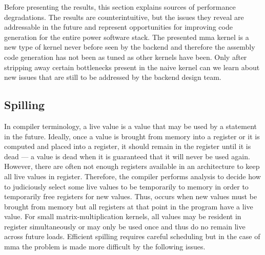 \documentclass[\main/thesis.tex]{subfiles}
\begin{document}
Before presenting the results, this section explains sources of performance degradations.
The results are counterintuitive, but the issues they reveal are addressable in the future and represent opportunities for improving code generation for the entire \gls{power} software stack.
The presented \gls{mma} kernel is a new type of kernel never before seen by the backend and therefore the assembly code generation has not been as tuned as other kernels have been.
Only after stripping away certain bottlenecks present in the naive kernel can we learn about new issues that are still to be addressed by the backend design team.

\subsection{Spilling}
In compiler terminology, a \gls{live} value is a value that may be used by a statement in the future.
Ideally, once a value is brought from memory into a register or it is computed and placed into a register, it should remain in the register until it is \gls{dead} --- a value is dead when it is guaranteed that it will never be used again.
However, there are often not enough registers available in an architecture to keep all live values in register.
Therefore, the compiler performs analysis to decide how to judiciously select some live values to be temporarily  to memory in order to temporarily free registers for new values.
Thus,  occurs when new values must be brought from memory but all registers at that \gls{point} in the program have a \gls{live} value.
For small matrix-multiplication kernels, all values may be resident in register simultaneously or may only be used once and thus do no remain \gls{live} across future loads.
Efficient spilling requires careful scheduling but in the case of \gls{mma} the problem is made more difficult by the following issues.
\end{document}
